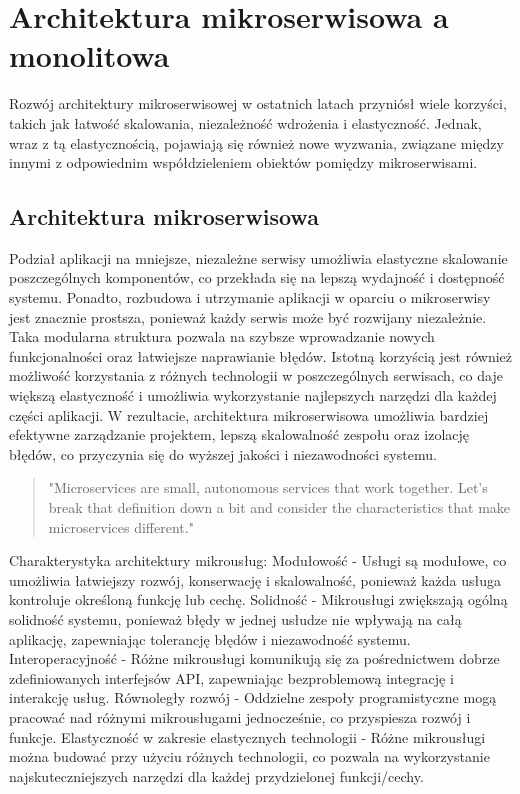 \documentclass[runningheads,12pt]{llncs}
\begin{document}
\newpage

\section{Architektura mikroserwisowa a monolitowa}

Rozwój architektury mikroserwisowej w ostatnich latach przyniósł wiele korzyści, takich jak łatwość skalowania, niezależność wdrożenia i elastyczność. Jednak, wraz z tą elastycznością, pojawiają się również nowe wyzwania, związane między innymi z odpowiednim współdzieleniem obiektów pomiędzy mikroserwisami.

\subsection{Architektura mikroserwisowa}

Podział aplikacji na mniejsze, niezależne serwisy umożliwia elastyczne skalowanie poszczególnych komponentów, co przekłada się na lepszą wydajność i dostępność systemu. Ponadto, rozbudowa i utrzymanie aplikacji w oparciu o mikroserwisy jest znacznie prostsza, ponieważ każdy serwis może być rozwijany niezależnie. Taka modularna struktura pozwala na szybsze wprowadzanie nowych funkcjonalności oraz łatwiejsze naprawianie błędów. Istotną korzyścią jest również możliwość korzystania z różnych technologii w poszczególnych serwisach, co daje większą elastyczność i umożliwia wykorzystanie najlepszych narzędzi dla każdej części aplikacji. W rezultacie, architektura mikroserwisowa umożliwia bardziej efektywne zarządzanie projektem, lepszą skalowalność zespołu oraz izolację błędów, co przyczynia się do wyższej jakości i niezawodności systemu.

\begin{quote}
    "Microservices are small, autonomous services that work together. Let’s break that definition down a bit and consider the characteristics that make microservices different."~\cite[p. 2]{newman2015building}
\end{quote}

Charakterystyka architektury mikrousług:
Modułowość - Usługi są modułowe, co umożliwia łatwiejszy rozwój, konserwację i skalowalność, ponieważ każda usługa kontroluje określoną funkcję lub cechę.
Solidność - Mikrousługi zwiększają ogólną solidność systemu, ponieważ błędy w jednej usłudze nie wpływają na całą aplikację, zapewniając tolerancję błędów i niezawodność systemu.
Interoperacyjność - Różne mikrousługi komunikują się za pośrednictwem dobrze zdefiniowanych interfejsów API, zapewniając bezproblemową integrację i interakcję usług.
Równoległy rozwój - Oddzielne zespoły programistyczne mogą pracować nad różnymi mikrousługami jednocześnie, co przyspiesza rozwój i funkcje.
Elastyczność w zakresie elastycznych technologii - Różne mikrousługi można budować przy użyciu różnych technologii, co pozwala na wykorzystanie najskuteczniejszych narzędzi dla każdej przydzielonej funkcji/cechy.~\cite{sharma2023monolithic}
\end{document}
